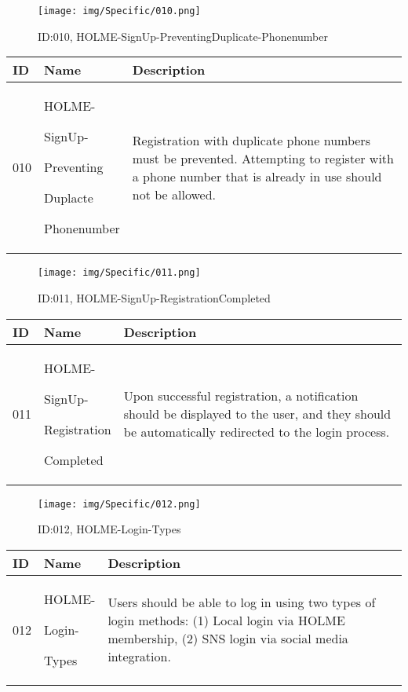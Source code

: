 \documentclass[conference]{IEEEtran}
\begin{document}
\begin{enumerate}
\begin{figure}[h]
\centering
\texttt{[image: img/Specific/010.png]}
\caption{ID:010, HOLME-SignUp-PreventingDuplicate-Phonenumber}
\end{figure}
\begin{table}[h]
\def\arraystretch{1.2} \small
    \begin{tabular}{|p{1cm}|p{1.8cm}|p{5.0cm}|}
        \hline
        ID & Name & Description\\ \hline
         010 \par  & HOLME-\par SignUp-\par Preventing \par Duplacte \par Phonenumber &Registration with duplicate phone numbers must be prevented. Attempting to register with a phone number that is already in use should not be allowed.\\ \hline
	\end{tabular}
\end{table}

\begin{figure}[h]
\centering
\texttt{[image: img/Specific/011.png]}
\caption{ID:011, HOLME-SignUp-RegistrationCompleted}
\end{figure}
\begin{table}[h]
\def\arraystretch{1.2} \small
    \begin{tabular}{|p{1cm}|p{1.8cm}|p{5.0cm}|}
        \hline
        ID & Name & Description\\ \hline
         011 \par  & HOLME-\par SignUp-\par Registration \par Completed &Upon successful registration, a notification should be displayed to the user, and they should be automatically redirected to the login process.\\ \hline
	\end{tabular}
\end{table}

\begin{figure}[h]
\centering
\texttt{[image: img/Specific/012.png]}
\caption{ID:012, HOLME-Login-Types}
\end{figure}
\begin{table}[h]
\def\arraystretch{1.2} \small
    \begin{tabular}{|p{1cm}|p{1.8cm}|p{5.0cm}|}
        \hline
        ID & Name & Description\\ \hline
         012 \par  & HOLME-\par Login-\par Types &Users should be able to log in using two types of login methods:
(1) Local login via HOLME membership, (2) SNS login via social media integration.\\ \hline
	\end{tabular}
\end{table}


\end{enumerate}
\end{document}
